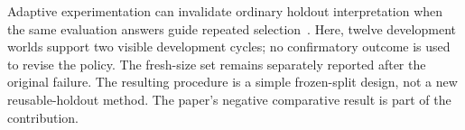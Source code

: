Adaptive experimentation can invalidate ordinary holdout interpretation when the same evaluation answers guide repeated selection~\cite{dwork2015holdout}. Here, twelve development worlds support two visible development cycles; no confirmatory outcome is used to revise the policy. The fresh-size set remains separately reported after the original failure. The resulting procedure is a simple frozen-split design, not a new reusable-holdout method. The paper's negative comparative result is part of the contribution.
